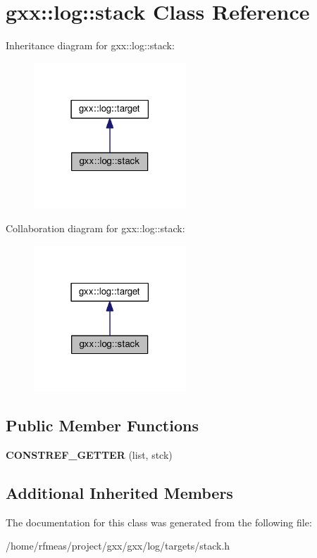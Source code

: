\hypertarget{classgxx_1_1log_1_1stack}{}\section{gxx\+:\+:log\+:\+:stack Class Reference}
\label{classgxx_1_1log_1_1stack}


Inheritance diagram for gxx\+:\+:log\+:\+:stack\+:
\nopagebreak
\begin{figure}[H]
\begin{center}
\leavevmode
\includegraphics[width=162pt]{classgxx_1_1log_1_1stack__inherit__graph}
\end{center}
\end{figure}


Collaboration diagram for gxx\+:\+:log\+:\+:stack\+:
\nopagebreak
\begin{figure}[H]
\begin{center}
\leavevmode
\includegraphics[width=162pt]{classgxx_1_1log_1_1stack__coll__graph}
\end{center}
\end{figure}
\subsection*{Public Member Functions}
\begin{DoxyCompactItemize}
\item 
{\bfseries C\+O\+N\+S\+T\+R\+E\+F\+\_\+\+G\+E\+T\+T\+ER} (list, stck)\hypertarget{classgxx_1_1log_1_1stack_a7995e5389618a3c8e6d603bcf74c3c71}{}\label{classgxx_1_1log_1_1stack_a7995e5389618a3c8e6d603bcf74c3c71}

\end{DoxyCompactItemize}
\subsection*{Additional Inherited Members}


The documentation for this class was generated from the following file\+:\begin{DoxyCompactItemize}
\item 
/home/rfmeas/project/gxx/gxx/log/targets/stack.\+h\end{DoxyCompactItemize}
